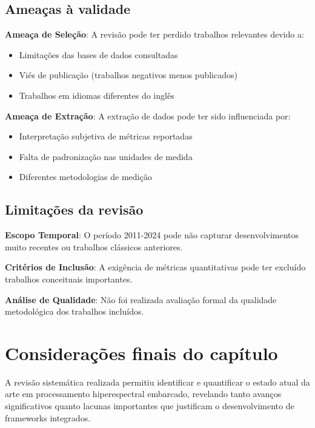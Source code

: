 \subsection{Ameaças à validade}\label{subsec:ameacas_validade}

\textbf{Ameaça de Seleção}: A revisão pode ter perdido trabalhos relevantes devido a:
\begin{itemize}
    \item Limitações das bases de dados consultadas
    \item Viés de publicação (trabalhos negativos menos publicados)
    \item Trabalhos em idiomas diferentes do inglês
\end{itemize}

\textbf{Ameaça de Extração}: A extração de dados pode ter sido influenciada por:
\begin{itemize}
    \item Interpretação subjetiva de métricas reportadas
    \item Falta de padronização nas unidades de medida
    \item Diferentes metodologias de medição
\end{itemize}

\subsection{Limitações da revisão}\label{subsec:limitacoes_revisao}

\textbf{Escopo Temporal}: O período 2011-2024 pode não capturar desenvolvimentos muito recentes ou trabalhos clássicos anteriores.

\textbf{Critérios de Inclusão}: A exigência de métricas quantitativas pode ter excluído trabalhos conceituais importantes.

\textbf{Análise de Qualidade}: Não foi realizada avaliação formal da qualidade metodológica dos trabalhos incluídos.

\section{Considerações finais do capítulo}\label{sec:consideracoes_finais_levantamento}

A revisão sistemática realizada permitiu identificar e quantificar o estado atual da arte em processamento hiperespectral embarcado, revelando tanto avanços significativos quanto lacunas importantes que justificam o desenvolvimento de frameworks integrados.

